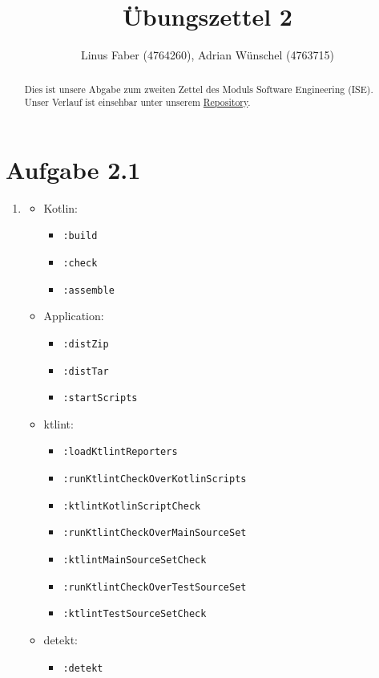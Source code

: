 \documentclass{article}
\title{Übungszettel 2}
\author{Linus Faber (4764260), Adrian Wünschel (4763715)}
\begin{document}
\maketitle

\begin{abstract}
Dies ist unsere Abgabe zum zweiten Zettel des Moduls Software Engineering (ISE).
Unser Verlauf ist einsehbar unter unserem \href{https://github.com/LinusFaber/ise26-27_assignment02}{Repository}.
\end{abstract}

\section*{Aufgabe 2.1}
\label{sec:a21}

\begin{enumerate}[label=\alph*)]

  \item %
  \begin{itemize}
    \item Kotlin:
    \begin{itemize}
      \item \texttt{:build}
      \item \texttt{:check}
      \item \texttt{:assemble}
    \end{itemize}
    \item Application:
    \begin{itemize}
      \item \texttt{:distZip}
      \item \texttt{:distTar}
      \item \texttt{:startScripts}
    \end{itemize}
    \item ktlint:
    \begin{itemize}
      \item \texttt{:loadKtlintReporters}
      \item \texttt{:runKtlintCheckOverKotlinScripts}
      \item \texttt{:ktlintKotlinScriptCheck}
      \item \texttt{:runKtlintCheckOverMainSourceSet}
      \item \texttt{:ktlintMainSourceSetCheck}
      \item \texttt{:runKtlintCheckOverTestSourceSet}
      \item \texttt{:ktlintTestSourceSetCheck}
    \end{itemize}
    \item detekt:
    \begin{itemize}
      \item \texttt{:detekt}
    \end{itemize}
  \end{itemize}


\end{enumerate}
\end{document}
